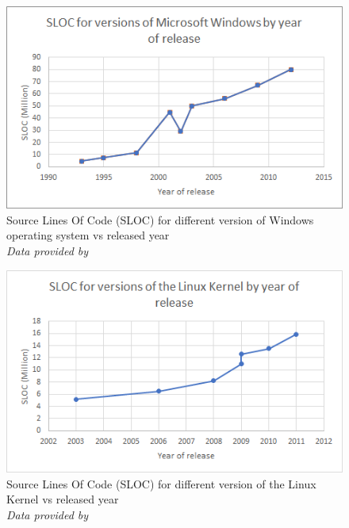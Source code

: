 \begin{figure} \begin{center}
\includegraphics[width=0.8\linewidth]{pics/SLOC_windows} 
\end{center} 
\caption{Source Lines Of Code (SLOC) for different version of Windows operating system vs released year\\ \textit{\small{Data provided by \cite{RN81}}}}
\label{SLOC_windows}
\end{figure}

\begin{figure} \begin{center}
\includegraphics[width=0.8\linewidth]{pics/SLOC_linux} 
\end{center} 
\caption{Source Lines Of Code (SLOC) for different version of the Linux Kernel vs released year\\ \textit{\small{Data provided by \cite{RN81}}}}
\label{SLOC_linux}
\end{figure}


